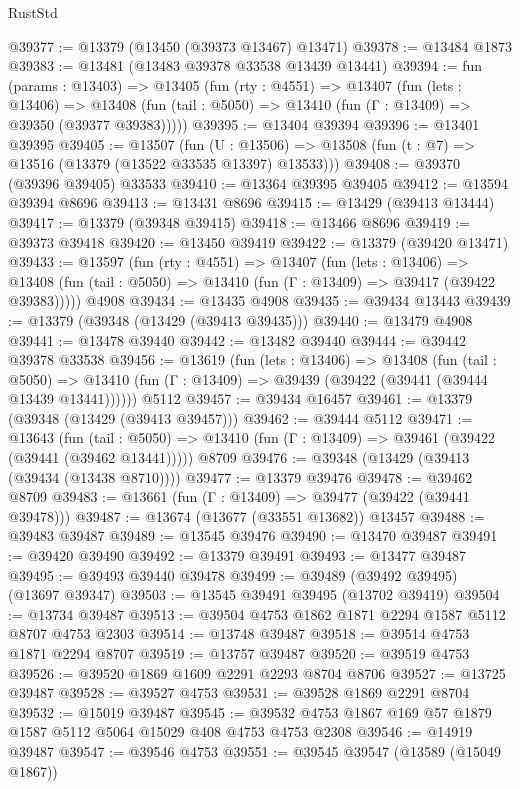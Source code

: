 \begin{lexlean}{RustStd}
\begin{coremodule}
@39377 := @13379 (@13450 (@39373 @13467) @13471)
@39378 := @13484 @1873
@39383 := @13481 (@13483 @39378 @33538 @13439 @13441)
@39394 := fun (params : @13403) =>
  @13405
    (fun (rty : @4551) =>
    @13407
      (fun (lets : @13406) =>
      @13408 (fun (tail : @5050) => @13410 (fun (Γ : @13409) => @39350 (@39377 @39383)))))
@39395 := @13404 @39394
@39396 := @13401 @39395
@39405 := @13507
    (fun (U : @13506) => @13508 (fun (t : @7) => @13516 (@13379 (@13522 @33535 @13397) @13533)))
@39408 := @39370 (@39396 @39405) @33533
@39410 := @13364 @39395 @39405
@39412 := @13594 @39394 @8696
@39413 := @13431 @8696
@39415 := @13429 (@39413 @13444)
@39417 := @13379 (@39348 @39415)
@39418 := @13466 @8696
@39419 := @39373 @39418
@39420 := @13450 @39419
@39422 := @13379 (@39420 @13471)
@39433 := @13597
    (fun (rty : @4551) =>
    @13407
      (fun (lets : @13406) =>
      @13408 (fun (tail : @5050) => @13410 (fun (Γ : @13409) => @39417 (@39422 @39383)))))
    @4908
@39434 := @13435 @4908
@39435 := @39434 @13443
@39439 := @13379 (@39348 (@13429 (@39413 @39435)))
@39440 := @13479 @4908
@39441 := @13478 @39440
@39442 := @13482 @39440
@39444 := @39442 @39378 @33538
@39456 := @13619
    (fun (lets : @13406) =>
    @13408
      (fun (tail : @5050) =>
      @13410 (fun (Γ : @13409) => @39439 (@39422 (@39441 (@39444 @13439 @13441))))))
    @5112
@39457 := @39434 @16457
@39461 := @13379 (@39348 (@13429 (@39413 @39457)))
@39462 := @39444 @5112
@39471 := @13643
    (fun (tail : @5050) => @13410 (fun (Γ : @13409) => @39461 (@39422 (@39441 (@39462 @13441)))))
    @8709
@39476 := @39348 (@13429 (@39413 (@39434 (@13438 @8710))))
@39477 := @13379 @39476
@39478 := @39462 @8709
@39483 := @13661 (fun (Γ : @13409) => @39477 (@39422 (@39441 @39478)))
@39487 := @13674 (@13677 (@33551 @13682)) @13457
@39488 := @39483 @39487
@39489 := @13545 @39476
@39490 := @13470 @39487
@39491 := @39420 @39490
@39492 := @13379 @39491
@39493 := @13477 @39487
@39495 := @39493 @39440 @39478
@39499 := @39489 (@39492 @39495) (@13697 @39347)
@39503 := @13545 @39491 @39495 (@13702 @39419)
@39504 := @13734 @39487
@39513 := @39504 @4753 @1862 @1871 @2294 @1587 @5112 @8707 @4753 @2303
@39514 := @13748 @39487
@39518 := @39514 @4753 @1871 @2294 @8707
@39519 := @13757 @39487
@39520 := @39519 @4753
@39526 := @39520 @1869 @1609 @2291 @2293 @8704 @8706
@39527 := @13725 @39487
@39528 := @39527 @4753
@39531 := @39528 @1869 @2291 @8704
@39532 := @15019 @39487
@39545 := @39532 @4753 @1867 @169 @57 @1879 @1587 @5112 @5064 @15029 @408 @4753 @4753 @2308
@39546 := @14919 @39487
@39547 := @39546 @4753
@39551 := @39545 @39547 (@13589 (@15049 @1867))

\end{coremodule}
\end{lexlean}

